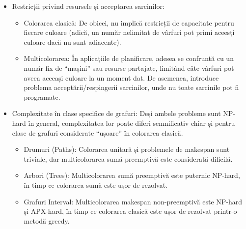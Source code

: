 \begin{itemize}
 \item Restricții privind resursele și acceptarea sarcinilor:
  \begin{itemize}
    \item Colorarea clasică: De obicei, nu implică restricții de capacitate pentru fiecare culoare (adică, un număr nelimitat de vârfuri pot primi aceesți culoare dacă nu sunt adiacente).
    \item Multicolorarea: În aplicațiile de planificare, adesea se confruntă cu un număr fix de ``mașini'' sau resurse partajate, limitând câte vârfuri pot aveea aceeași culoare la un moment dat. De asemenea, introduce problema acceptării/respingerii sarcinilor, unde nu toate sarcinile pot fi programate.
  \end{itemize}
  \item Complexitate în clase specifice de grafuri: Deși ambele probleme sunt NP-hard în general, complexitatea lor poate diferi semnificativ chiar și pentru clase de grafuri considerate ``ușoare'' în colorarea clasică.\cite{halldorsson2004multicoloring}
  \begin{itemize}
   \item Drumuri (Paths): Colorarea unitară și problemele de makespan sunt triviale, dar multicolorarea sumă preemptivă este considerată dificilă.\cite{halldorsson2004multicoloring}
   \item Arbori (Trees): Multicolorarea sumă preemptivă este puternic NP-hard, în timp ce colorarea sumă este ușor de rezolvat.\cite{halldorsson2004multicoloring}
  \item Grafuri Interval: Multicolorarea makespan non-preemptivă este NP-hard și APX-hard, în timp ce colorarea clasică este ușor de rezolvat printr-o metodă greedy.\cite{halldorsson2004multicoloring}
  \end{itemize}

 \end{itemize}
